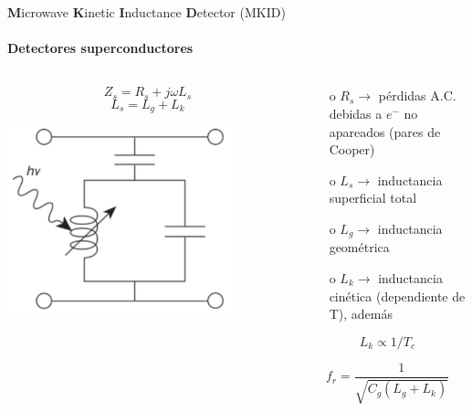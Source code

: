 \documentclass[ignorenonframetext,12pt]{beamer}
\begin{document}
\begin{frame}{\textbf{M}icrowave \textbf{K}inetic \textbf{I}nductance
				\textbf{D}etector (MKID)}
				\framesubtitle{Detectores superconductores}
				\begin{columns}
								\begin{column}{0.49\textwidth}
												\begin{equation*}
																Z_s = R_s + j \omega L_s
												\end{equation*}
												\begin{equation*}
																L_s = L_g + L_k
												\end{equation*}

												\flushleft	\includegraphics[width=0.8\textwidth]{LCR_mkid}
								\end{column}
								\begin{column}{0.59\textwidth}
												\begin{itemize}
																\item[o] $R_s \to$ pérdidas A.C. debidas a $e^-$ no apareados
																				(pares de Cooper)
																\item[o] $L_s \to$ inductancia superficial total
																\item[o] $L_g \to$ inductancia geométrica
																\item[o] $L_k \to$ inductancia cinética
																				({\color{blue}dependiente de T}), además
												\end{itemize}

												\begin{equation*}
																L_k \propto 1/T_c
												\end{equation*}

												\begin{equation*}
																f_r = \frac{1}{\sqrt{C_g(L_g + L_k)}}
												\end{equation*}
								\end{column}
				\end{columns}
\end{frame}
\end{document}
